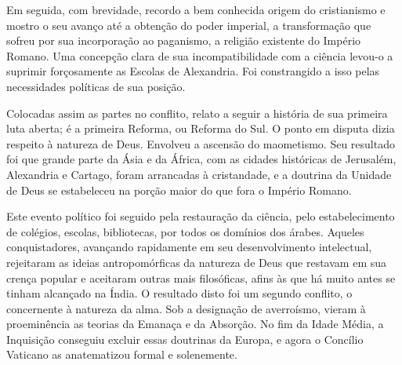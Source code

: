 \documentclass[11pt,a5paper,twoside,openany]{book}
\begin{document}
Em seguida, com brevidade, recordo a bem conhecida origem do cristianismo e mostro o seu avanço até a obtenção do poder imperial, a transformação que sofreu por sua incorporação ao paganismo, a religião existente do Império Romano. Uma concepção clara de sua incompatibilidade com a ciência levou-o a suprimir forçosamente as Escolas de Alexandria. Foi constrangido a isso pelas necessidades políticas de sua posição.

Colocadas assim as partes no conflito, relato a seguir a história de sua primeira luta aberta; é a primeira Reforma, ou Reforma do Sul. O ponto em disputa dizia respeito à natureza de Deus. Envolveu a ascensão do maometismo. Seu resultado foi que grande parte da Ásia e da África, com as cidades históricas de Jerusalém, Alexandria e Cartago, foram arrancadas à cristandade, e a doutrina da Unidade de Deus se estabeleceu na porção maior do que fora o Império Romano.

Este evento político foi seguido pela restauração da ciência, pelo estabelecimento de colégios, escolas, bibliotecas, por todos os domínios dos árabes. Aqueles conquistadores, avançando rapidamente em seu desenvolvimento intelectual, rejeitaram as ideias antropomórficas da natureza de Deus que restavam em sua crença popular e aceitaram outras mais filosóficas, afins às que há muito antes se tinham alcançado na Índia. O resultado disto foi um segundo conflito, o concernente à natureza da alma. Sob a designação de averroísmo, vieram à proeminência as teorias da Emanaça e da Absorção. No fim da Idade Média, a Inquisição conseguiu excluir essas doutrinas da Europa, e agora o Concílio Vaticano as anatematizou formal e solenemente.
\end{document}

